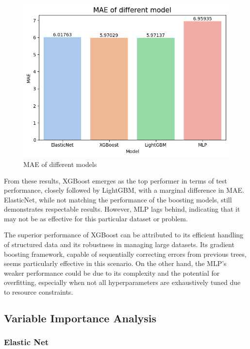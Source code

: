 \documentclass[12pt]{article}
\newtheorem{Proof of Lemma}{Proof of Lemma}
\begin{document}
\begin{figure}[H]
  \centering
  \includegraphics[width=0.7\linewidth]{images/res.png}
  \caption{MAE of different models}
  \label{fig:res}
\end{figure}

From these results, XGBoost emerges as the top performer in terms of test performance, closely followed by LightGBM, with a marginal difference in MAE. ElasticNet, while not matching the performance of the boosting models, still demonstrates respectable results. However, MLP lags behind, indicating that it may not be as effective for this particular dataset or problem.

The superior performance of XGBoost can be attributed to its efficient handling of structured data and its robustness in managing large datasets. Its gradient boosting framework, capable of sequentially correcting errors from previous trees, seems particularly effective in this scenario. On the other hand, the MLP's weaker performance could be due to its complexity and the potential for overfitting, especially when not all hyperparameters are exhaustively tuned due to resource constraints.

\subsection{Variable Importance Analysis}

\subsubsection*{Elastic Net}
\end{document}
